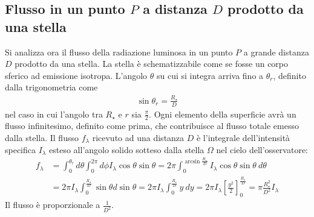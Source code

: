 \documentclass[a4paper, oneside]{book}
\begin{document}
\subsection{Flusso in un punto $P$ a distanza $D$ prodotto da una stella}
\begin{figure}
    \centering
\end{figure}
Si analizza ora il flusso della radiazione luminosa in un punto $P$ a grande distanza $D$ prodotto da una stella.
La stella è schematizzabile come se fosse un corpo sferico ad emissione isotropa. 
L'angolo $\theta$ su cui si integra arriva fino a $\theta_r$, definito dalla trigonometria come
\begin{gather*}
    \sin\theta_r = \frac{R_{\star}}{D}
\end{gather*}
nel caso in cui l'angolo tra $R_\star$ e $r$ sia $\frac{\pi}{2}$. Ogni elemento della superficie
avrà un flusso infinitesimo, definito come prima, che contribuisce al flusso totale emesso
dalla stella. Il flusso $f_\lambda$ ricevuto ad una distanza $D$ è l'integrale dell'intensità specifica 
$I_\lambda$ esteso all'angolo solido sotteso dalla stella $\Omega$ nel cielo dell'osservatore:
\begin{align*}
    f_\lambda &= \int_{0}^{\theta_r} d\theta \int_{0}^{2\pi} d\phi I_\lambda \cos\theta \sin\theta  = 2\pi \int_{0}^{\arcsin \frac{R_\star}{D}} I_\lambda \cos\theta\sin\theta \ d\theta  \\
    &= 2\pi I_\lambda \int_{0}^{\frac{R_\star}{D}}\sin\theta d\sin\theta  = 2\pi I_\lambda \int_{0}^{\frac{R_\star}{D}}y \ dy = 2\pi I_\lambda \left[\frac{y^{2}}{2}\right]^{\frac{R_\star}{D}}_{0} = \pi \frac{R_\star^{2}}{D^{2}}I_\lambda 
\end{align*} 
Il flusso è proporzionale a $\frac{1}{D^{2}}$. 
\end{document}
